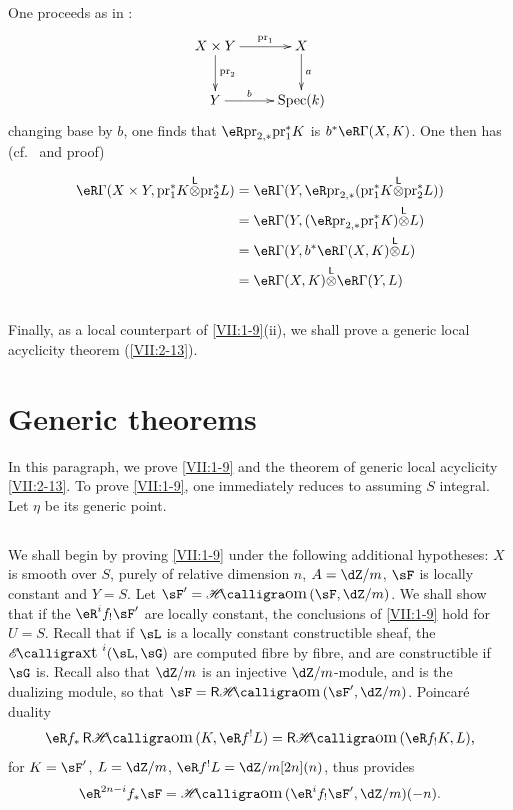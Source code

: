 One proceeds as in \cite[XVII 5.4.3]{sga4}:
\[\xymatrix{
  X\times Y \ar[r]^-{\text{pr}_1} \ar[d]^-{\text{pr}_2}
    & X \ar[d]^-a \\
  Y \ar[r]^-b
    & \spec(k)
}\]
changing base by $b$, one finds that
$\eR\pr_{2,\ast}{} \pr_1^\ast K$ is
$b^\ast \eR\Gamma(X,K)$. One then has (cf.\ \cite[XVII 5.2.11]{sga4} and proof)

\begin{align*}
  \eR\Gamma(X\times Y,\pr_1^\ast K\lotimes \pr_2^\ast L)
    &= \eR\Gamma(Y,\eR \pr_{2,\ast}(\pr_1^\ast K\lotimes \pr_2^\ast L)) \\
    &= \eR\Gamma(Y,(\eR\pr_{2,\ast}\pr_1^\ast K)\lotimes L) \\
    &= \eR\Gamma(Y,b^\ast \eR\Gamma(X,K)\lotimes L) \\
    &= \eR\Gamma(X,K)\lotimes \eR\Gamma(Y,L)
\end{align*}




\subsection{}\label{VII:1-12}

Finally, as a local counterpart of \ref{VII:1-9}(ii), we shall prove a
generic local acyclicity theorem (\ref{VII:2-13}).










\section{Generic theorems}\label{VII:2}

In this paragraph, we prove \ref{VII:1-9} and the theorem
of generic local acyclicity \ref{VII:2-13}. To prove \ref{VII:1-9},
one immediately reduces to assuming $S$ integral. Let $\eta$ be its
generic point.




\subsection{}\label{VII:2-1}

We shall begin by proving \ref{VII:1-9} under the following
additional hypotheses: $X$ is smooth over $S$, purely of relative dimension
$n$, $A=\dZ/m$, $\sF$ is locally constant and $Y=S$. Let
$\sF'=\Hom(\sF,\dZ/m)$. We shall show that if the $\eR^i f_! \sF'$ are
locally constant, the conclusions of \ref{VII:1-9} hold for $U=S$.
Recall that if $\sL$ is a locally constant constructible sheaf, the
$\Ext^i(\sL,\sG)$ are computed fibre by fibre, and are constructible if $\sG$
is. Recall also that $\dZ/m$ is an injective $\dZ/m$-module, and is the
dualizing module, so that $\sF=\rHom(\sF',\dZ/m)$. Poincar\'e duality
\[
  \eR f_\ast \rHom(K,\eR f^! L) = \rHom(\eR f_! K,L) \text{,}
\]
for $K=\sF'$, $L=\dZ/m$, $\eR f^! L = \dZ/m[2n](n)$, thus provides
\[
  \eR^{2n-i} f_\ast \sF = \Hom(\eR^i f_! \sF',\dZ/m)(-n) \text{.}
\]

